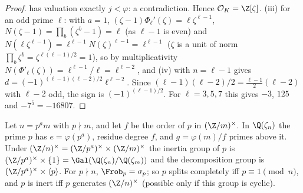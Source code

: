 \begin{proof}
has valuation exactly $j<\varphi$:
a contradiction. Hence $\mathcal O_K=\Z[\zeta]$.
(iii) for an odd prime $\ell$: with $a=1$, $(\zeta-1)\Phi_\ell'(\zeta)=\ell\zeta^{\ell-1}$, $N(\zeta-1)=\prod_b(\zeta^b-1)=\ell$ (as $\ell-1$ is even) and
$N(\ell\zeta^{\ell-1})=\ell^{\ell-1}N(\zeta)^{\ell-1}=\ell^{\ell-1}$ ($\zeta$ is a unit of norm $\prod_b\zeta^b=\zeta^{\ell(\ell-1)/2}=1$), so by multiplicativity
$N(\Phi'_\ell(\zeta))=\ell^{\ell-1}/\ell=\ell^{\ell-2}$, and (iv) with $n=\ell-1$ gives $d=(-1)^{(\ell-1)(\ell-2)/2}\ell^{\ell-2}$. Since
$(\ell-1)(\ell-2)/2=\frac{\ell-1}2(\ell-2)$ with $\ell-2$ odd, the sign is $(-1)^{(\ell-1)/2}$. For $\ell=3,5,7$ this gives $-3$, $125$ and $-7^5=-16807$.
\end{proof}

\begin{theorem}\label{thm:ant:cyclotomicsplitting}
Let $n=p^am$ with $p\nmid m$, and let $f$ be the order of $p$ in $(\Z/m)^\times$. In $\Q(\zeta_n)$ the prime $p$ has $e=\varphi(p^a)$, residue degree $f$, and
$g=\varphi(m)/f$ primes above it. Under $(\Z/n)^\times=(\Z/p^a)^\times\times(\Z/m)^\times$ the inertia group of $p$ is $(\Z/p^a)^\times\times\{1\}=\Gal(\Q(\zeta_n)/\Q(\zeta_m))$
and the decomposition group is $(\Z/p^a)^\times\times\langle p\rangle$. For $p\nmid n$, $\Frob_p=\sigma_p$; so $p$ splits completely iff $p\equiv1\pmod n$, and $p$ is
inert iff $p$ generates $(\Z/n)^\times$ (possible only if this group is cyclic).
\end{theorem}

